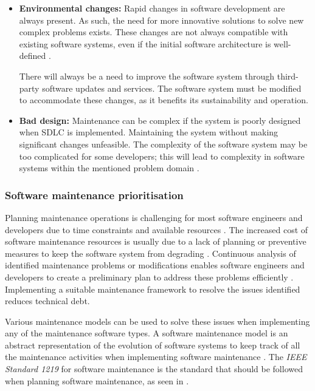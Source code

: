 \begin{itemize}
	\item \textbf{Environmental changes:} Rapid changes in software development are always present. As such, the need for more innovative solutions to solve new complex problems exists. These changes are not always compatible with existing software systems, even if the initial software architecture is well-defined \cite{Ogheneovo2014}. \par There will always be a need to improve the software system through third-party software updates and services. The software system must be modified to accommodate these changes, as it benefits its sustainability and operation.
	\item \textbf{Bad design:} Maintenance can be complex if the system is poorly designed when SDLC is implemented. Maintaining the system without making significant changes unfeasible. The complexity of the software system may be too complicated for some developers; this will lead to complexity in software systems within the mentioned problem domain \cite{Lenarduzzi2017}.
\end{itemize}

\subsubsection{Software maintenance prioritisation}\label{sec:ch1_maintenanceModel}
Planning maintenance operations is challenging for most software engineers and developers due to time constraints and available resources \cite{DeLeon-Sigg2020}. The increased cost of software maintenance resources is usually due to a lack of planning or preventive measures to keep the software system from degrading \cite{Alenezi2016}. Continuous analysis of identified maintenance problems or modifications enables software engineers and developers to create a preliminary plan to address these problems efficiently \cite{Port2017}. Implementing a suitable maintenance framework to resolve the issues identified reduces technical debt.\par Various maintenance models can be used to solve these issues when implementing any of the maintenance software types. A software maintenance model is an abstract representation of the evolution of software systems to keep track of all the maintenance activities when implementing software maintenance \cite{Ren2011}. The \textit{IEEE Standard 1219} for software maintenance is the standard that should be followed when planning software maintenance, as seen in . 

